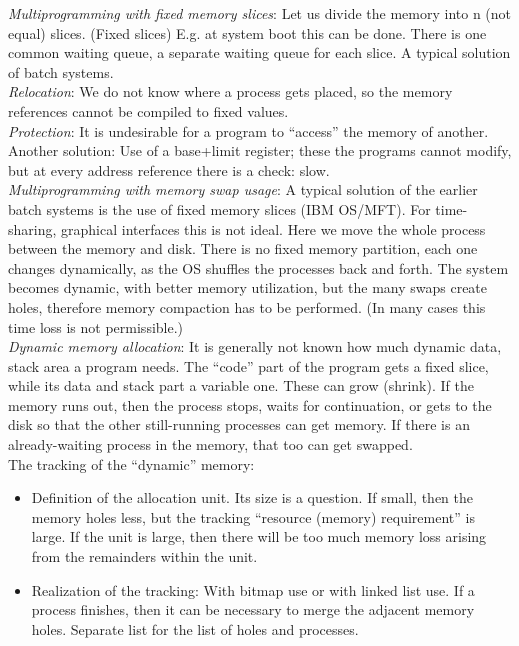 \documentclass[margin=0px]{article}
\begin{document}
\textit{Multiprogramming with fixed memory slices}: Let us divide the memory into n (not equal) slices. (Fixed slices) E.g. at system boot this can be done. There is one common waiting queue, a separate waiting queue for each slice. A typical solution of batch systems. \\
\textit{Relocation}: We do not know where a process gets placed, so the memory references cannot be compiled to fixed values. \\
\textit{Protection}: It is undesirable for a program to ``access'' the memory of another. \\
Another solution: Use of a base+limit register; these the programs cannot modify, but at every address reference there is a check: slow. \\
\textit{Multiprogramming with memory swap usage}: A typical solution of the earlier batch systems is the use of fixed memory slices (IBM OS/MFT). For time-sharing, graphical interfaces this is not ideal. Here we move the whole process between the memory and disk. There is no fixed memory partition, each one changes dynamically, as the OS shuffles the processes back and forth. The system becomes dynamic, with better memory utilization, but the many swaps create holes, therefore memory compaction has to be performed. (In many cases this time loss is not permissible.) \\
\textit{Dynamic memory allocation}: It is generally not known how much dynamic data, stack area a program needs. The ``code'' part of the program gets a fixed slice, while its data and stack part a variable one. These can grow (shrink). If the memory runs out, then the process stops, waits for continuation, or gets to the disk so that the other still-running processes can get memory. If there is an already-waiting process in the memory, that too can get swapped. \\
The tracking of the ``dynamic'' memory:
\begin{itemize}
    \item Definition of the allocation unit. Its size is a question. If small, then the memory holes less, but the tracking ``resource (memory) requirement'' is large. If the unit is large, then there will be too much memory loss arising from the remainders within the unit.
    \item Realization of the tracking: With bitmap use or with linked list use. If a process finishes, then it can be necessary to merge the adjacent memory holes. Separate list for the list of holes and processes.
\end{itemize}
\end{document}
